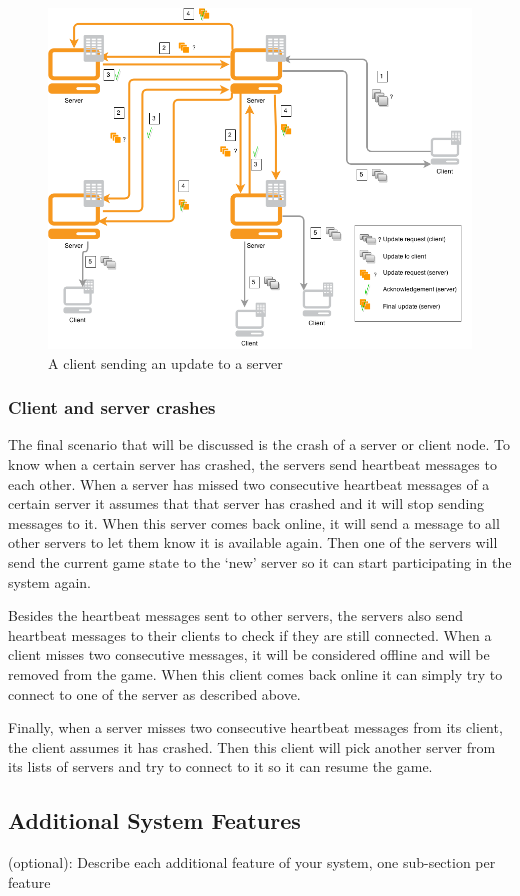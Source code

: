 \begin{figure}[h!]
  \centering
    \includegraphics[width=\textwidth]{diagrams/game-update}
    
  \caption{A client sending an update to a server}
  \label{update_diagram}
\end{figure}

\subsubsection*{Client and server crashes}
The final scenario that will be discussed is the crash of a server or client node. To know when a certain server has crashed, the servers send heartbeat messages to each other. When a server has missed two consecutive heartbeat messages of a certain server it assumes that that server has crashed and it will stop sending messages to it. When this server comes back online, it will send a message to all other servers to let them know it is available again. Then one of the servers will send the current game state to the `new' server so it can start participating in the system again. 

Besides the heartbeat messages sent to other servers, the servers also send heartbeat messages to their clients to check if they are still connected. When a client misses two consecutive messages, it will be considered offline and will be removed from the game. When this client comes back online it can simply try to connect to one of the server as described above.

Finally, when a server misses two consecutive heartbeat messages from its client, the client assumes it has crashed. Then this client will pick another server from its lists of servers and try to connect to it so it can resume the game.

\subsection{Additional System Features}
(optional): Describe each additional feature of your system, one sub-section per feature
 